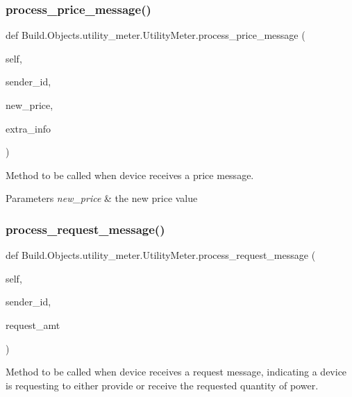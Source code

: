 \subsubsection{\texorpdfstring{process\+\_\+price\+\_\+message()}{process\_price\_message()}}
{\footnotesize\ttfamily def Build.\+Objects.\+utility\+\_\+meter.\+Utility\+Meter.\+process\+\_\+price\+\_\+message (\begin{DoxyParamCaption}\item[{}]{self,  }\item[{}]{sender\+\_\+id,  }\item[{}]{new\+\_\+price,  }\item[{}]{extra\+\_\+info }\end{DoxyParamCaption})}



Method to be called when device receives a price message. 


\begin{DoxyParams}{Parameters}
{\em new\+\_\+price} & the new price value \\
\hline
\end{DoxyParams}
\mbox{\label{class_build_1_1_objects_1_1utility__meter_1_1_utility_meter_ae450ec6bdd72caebb6163ae05490a1f8}} 
\subsubsection{\texorpdfstring{process\+\_\+request\+\_\+message()}{process\_request\_message()}}
{\footnotesize\ttfamily def Build.\+Objects.\+utility\+\_\+meter.\+Utility\+Meter.\+process\+\_\+request\+\_\+message (\begin{DoxyParamCaption}\item[{}]{self,  }\item[{}]{sender\+\_\+id,  }\item[{}]{request\+\_\+amt }\end{DoxyParamCaption})}



Method to be called when device receives a request message, indicating a device is requesting to either provide or receive the requested quantity of power. 


